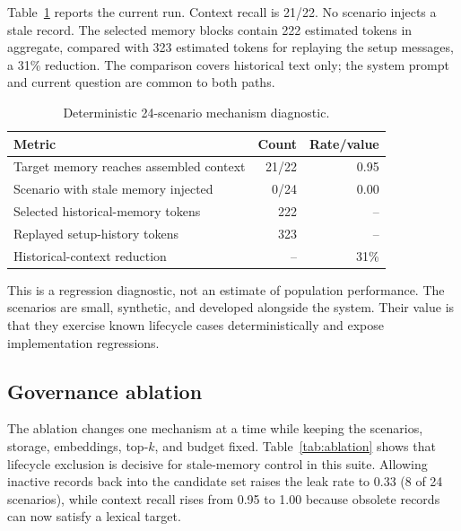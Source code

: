 \documentclass[11pt]{article}
\begin{document}
Table~\ref{tab:diagnostic} reports the current run. Context recall is 21/22.
No scenario injects a stale record. The selected memory blocks contain 222
estimated tokens in aggregate, compared with 323 estimated tokens for replaying
the setup messages, a 31\% reduction. The comparison covers historical text
only; the system prompt and current question are common to both paths.

\begin{table}[tbp]
\centering
\small
\caption{Deterministic 24-scenario mechanism diagnostic.}
\label{tab:diagnostic}
\begin{tabular}{@{}lrr@{}}
\toprule
\textbf{Metric} & \textbf{Count} & \textbf{Rate/value} \\
\midrule
Target memory reaches assembled context & 21/22 & 0.95 \\
Scenario with stale memory injected & 0/24 & 0.00 \\
Selected historical-memory tokens & 222 & -- \\
Replayed setup-history tokens & 323 & -- \\
Historical-context reduction & -- & 31\% \\
\bottomrule
\end{tabular}
\end{table}

This is a regression diagnostic, not an estimate of population performance.
The scenarios are small, synthetic, and developed alongside the system. Their
value is that they exercise known lifecycle cases deterministically and expose
implementation regressions.

\subsection{Governance ablation}

The ablation changes one mechanism at a time while keeping the scenarios,
storage, embeddings, top-$k$, and budget fixed. Table~\ref{tab:ablation} shows
that lifecycle exclusion is decisive for stale-memory control in this suite.
Allowing inactive records back into the candidate set raises the leak rate to
0.33 (8 of 24 scenarios), while context recall rises from 0.95 to 1.00 because
obsolete records can now satisfy a lexical target.
\end{document}

